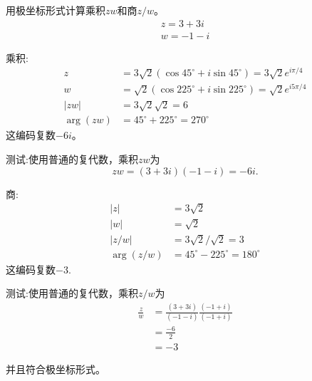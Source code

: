 \begin{example}
    用极坐标形式计算乘积$ zw $和商$z / w$。
    $$
    \begin{gathered}
    z=3+3 i \\
    w=-1-i
    \end{gathered}
    $$
    
    乘积:
    $$
    \begin{aligned}
    z & =3 \sqrt{2}\left(\cos 45^{\circ}+i \sin 45^{\circ}\right)=3 \sqrt{2} e^{i \pi / 4} \\
    w & =\sqrt{2}\left(\cos 225^{\circ}+i \sin 225^{\circ}\right)=\sqrt{2} e^{i 5 \pi / 4} \\
    |z w| & =3 \sqrt{2} \sqrt{2}=6 \\
    \arg (z w) & =45^{\circ}+225^{\circ}=270^{\circ}
    \end{aligned}
    $$
    这编码复数$-6 i$。
    
    测试:使用普通的复代数，乘积$ zw $为
    $$
    z w=(3+3 i)(-1-i)=-6 i .
    $$
    
    商:
    $$
    \begin{aligned}
    |z| & =3 \sqrt{2} \\
    |w| & =\sqrt{2} \\
    |z / w| & =3 \sqrt{2} / \sqrt{2}=3 \\
    \arg (z / w) & =45^{\circ}-225^{\circ}=180^{\circ}
    \end{aligned}
    $$
    这编码复数$-3$.
    
    测试:使用普通的复代数，乘积$ z/w $为
    $$
    \begin{aligned}
    \frac{z}{w} & =\frac{(3+3 i)}{(-1-i)} \frac{(-1+i)}{(-1+i)} \\
    & =\frac{-6}{2} \\
    & =-3
    \end{aligned}
    $$
    
    并且符合极坐标形式。
\end{example}

